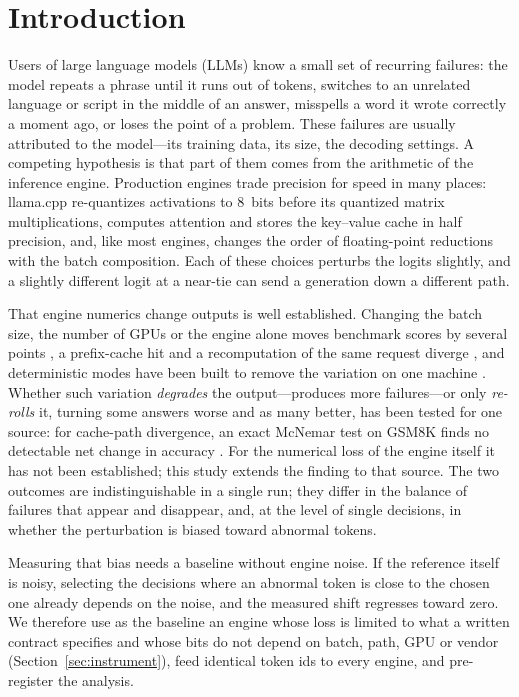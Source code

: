 \documentclass[11pt]{article}
\begin{document}
\section{Introduction}\label{sec:intro}

Users of large language models (LLMs) know a small set of recurring failures: the model repeats a phrase until it runs out
of tokens, switches to an unrelated language or script in the middle of an answer, misspells a word it wrote correctly a
moment ago, or loses the point of a problem. These failures are usually attributed to the model---its training data, its
size, the decoding settings. A competing hypothesis is that part of them comes from the arithmetic of the inference engine.
Production engines trade precision for speed in many places: llama.cpp re-quantizes activations to 8~bits before its
quantized matrix multiplications, computes attention and stores the key--value cache in half precision, and, like most
engines, changes the order of floating-point reductions with the batch composition. Each of these choices perturbs the
logits slightly, and a slightly different logit at a near-tie can send a generation down a different path.

That engine numerics change outputs is well established. Changing the batch size, the number of GPUs or the engine alone
moves benchmark scores by several points \citep{yuan2025,pape2026}, a prefix-cache hit and a recomputation of the same
request diverge \citep{patodiya2026}, and deterministic modes have been built to remove the variation on one machine
\citep{he2025,qin2026}. Whether such variation \emph{degrades} the output---produces more failures---or only
\emph{re-rolls} it, turning some answers worse and as many better, has been tested for one source: for cache-path
divergence, an exact McNemar test on GSM8K finds no detectable net change in accuracy \citep{patodiya2026}. For the
numerical loss of the engine itself it has not been established; this study extends the finding to that source. The two
outcomes are indistinguishable in a single run; they differ in the balance of failures that appear and disappear, and, at
the level of single decisions, in whether the perturbation is biased toward abnormal tokens.

Measuring that bias needs a baseline without engine noise. If the reference itself is noisy, selecting the decisions where
an abnormal token is close to the chosen one already depends on the noise, and the measured shift regresses toward zero. We
therefore use as the baseline an engine whose loss is limited to what a written contract specifies and whose bits do not
depend on batch, path, GPU or vendor (Section~\ref{sec:instrument}), feed identical token ids to every engine, and
pre-register the analysis.
\end{document}
